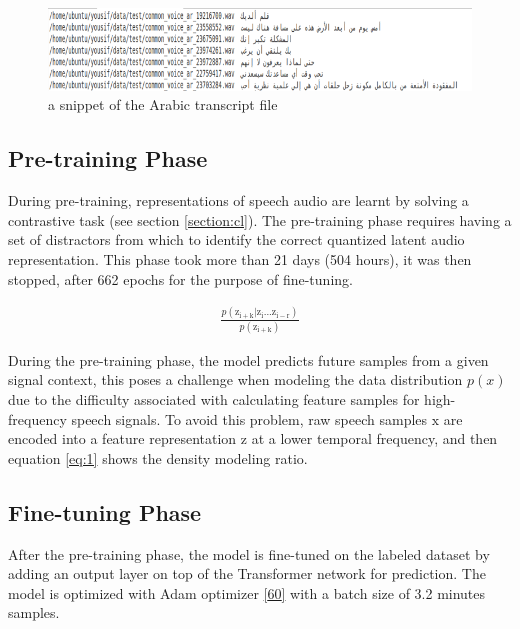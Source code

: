 \documentclass[
  a4paper,
]{article}
\begin{document}
\begin{figure}

{\centering \includegraphics{arabic} 

}

\caption{a snippet of the Arabic transcript file}\label{fig:arabic}
\end{figure}

\hypertarget{pre-training-phase}{%
\subsection{Pre-training Phase}\label{pre-training-phase}}

During pre-training, representations of speech audio are learnt by
solving a contrastive task (see section \ref{section:cl}). The
pre-training phase requires having a set of distractors from which to
identify the correct quantized latent audio representation. This phase
took more than 21 days (504 hours), it was then stopped, after 662
epochs for the purpose of fine-tuning.

\begin{align}
\label{eq:1}
\frac{p(\mathrm{z_{i+k}}|\mathrm{z_i}...\mathrm{z_{i-r}})}{p(\mathrm{z_{i+k}})}
\end{align}

During the pre-training phase, the model predicts future samples from a
given signal context, this poses a challenge when modeling the data
distribution \(p(x)\) due to the difficulty associated with calculating
feature samples for high-frequency speech signals. To avoid this
problem, raw speech samples \(\mathrm{x}\) are encoded into a feature
representation \(\mathrm{z}\) at a lower temporal frequency, and then
equation \ref{eq:1} shows the density modeling ratio.

\hypertarget{fine-tuning-phase}{%
\subsection{Fine-tuning Phase}\label{fine-tuning-phase}}

After the pre-training phase, the model is fine-tuned on the labeled
dataset by adding an output layer on top of the Transformer network for
prediction. The model is optimized with Adam optimizer
\protect\hyperlink{ref-kingma2017adam}{{[}60{]}} with a batch size of
3.2 minutes samples.
\end{document}
